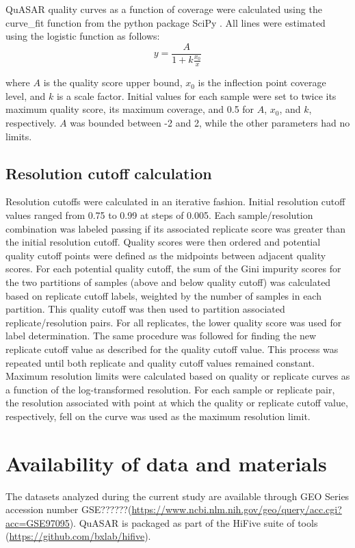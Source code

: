 QuASAR quality curves as a function of coverage were calculated using the curve\_fit function from the python package SciPy \cite{walt_numpy_2011}. All lines were estimated using the logistic function as follows:
\[y=\frac{A}{1+k\frac{x_0}{x}}\]

where $A$ is the quality score upper bound, $x_0$ is the inflection point coverage level, and $k$ is a scale factor. Initial values for each sample were set to twice its maximum quality score, its maximum coverage, and 0.5 for $A$, $x_0$, and $k$, respectively. $A$ was bounded between -2 and 2, while the other parameters had no limits.

\subsection{Resolution cutoff calculation}

Resolution cutoffs were calculated in an iterative fashion. Initial resolution cutoff values ranged from 0.75 to 0.99 at steps of 0.005. Each sample/resolution combination was labeled passing if its associated replicate score was greater than the initial resolution cutoff. Quality scores were then ordered and potential quality cutoff points were defined as the midpoints between adjacent quality scores. For each potential quality cutoff, the sum of the Gini impurity scores for the two partitions of samples (above and below quality cutoff) was calculated based on replicate cutoff labels, weighted by the number of samples in each partition. This quality cutoff was then used to partition associated replicate/resolution pairs. For all replicates, the lower quality score was used for label determination. The same procedure was followed for finding the new replicate cutoff value as described for the quality cutoff value. This process was repeated until both replicate and quality cutoff values remained constant. Maximum resolution limits were calculated based on quality or replicate curves as a function of the log-transformed resolution. For each sample or replicate pair, the resolution associated with point at which the quality or replicate cutoff value, respectively, fell on the curve was used as the maximum resolution limit.

\section{Availability of data and materials}

The datasets analyzed during the current study are available through GEO Series accession number GSE??????(\url{https://www.ncbi.nlm.nih.gov/geo/query/acc.cgi?acc=GSE97095}). QuASAR is packaged as part of the HiFive suite of tools (\url{https://github.com/bxlab/hifive}).

